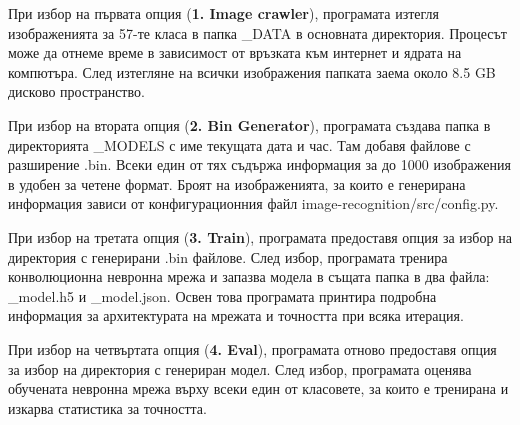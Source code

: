 При избор на първата опция (\textbf{1. Image crawler}), програмата изтегля изображенията за 57-те класа в папка \_DATA в основната директория. Процесът може да отнеме време в зависимост от връзката към интернет и ядрата на компютъра. След изтегляне на всички изображения папката заема около 8.5 GB дисково пространство.

При избор на втората опция (\textbf{2. Bin Generator}), програмата създава папка в директорията \_MODELS с име текущата дата и час. Там добавя файлове с разширение .bin. Всеки един от тях съдържа информация за до 1000 изображения в удобен за четене формат. Броят на изображенията, за които е генерирана информация зависи от конфигурационния файл image-recognition/src/config.py.

При избор на третата опция (\textbf{3. Train}), програмата предоставя опция за избор на директория с генерирани .bin файлове. След избор, програмата тренира конволюционна невронна мрежа и запазва модела в същата папка в два файла: \_model.h5 и \_model.json. Освен това програмата принтира подробна информация за архитектурата на мрежата и точността при всяка итерация.

При избор на четвъртата опция (\textbf{4. Eval}), програмата отново предоставя опция за избор на директория с генериран модел. След избор, програмата оценява обучената невронна мрежа върху всеки един от класовете, за които е тренирана и изкарва статистика за точността.






